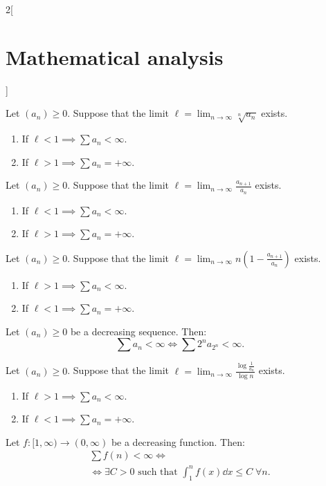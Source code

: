 \documentclass[../../../main.tex]{subfiles}
\begin{document}
\begin{multicols}{2}[\section{Mathematical analysis}]
\begin{theorem}
\end{theorem}
\begin{theorem}
Let $(a_n)\geq 0$. Suppose that the limit $\displaystyle \ell=\lim_{n\to\infty}\sqrt[n]{a_n}$ exists.
\begin{enumerate}
    \item If $\ell<1\implies\sum a_n<\infty$.
    \item If $\ell>1\implies\sum a_n=+\infty$.
\end{enumerate}
\end{theorem}
\begin{theorem}
Let $(a_n)\geq 0$. Suppose that the limit $\displaystyle \ell=\lim_{n\to\infty}\frac{a_{n+1}}{a_n}$ exists.
\begin{enumerate}
    \item If $\ell<1\implies\sum a_n<\infty$.
    \item If $\ell>1\implies\sum a_n=+\infty$.
\end{enumerate}
\end{theorem}
\begin{theorem}
Let $(a_n)\geq 0$. Suppose that the limit $\displaystyle \ell=\lim_{n\to\infty}n\left(1-\frac{a_{n+1}}{a_n}\right)$ exists.
\begin{enumerate}
    \item If $\ell>1\implies\sum a_n<\infty$.
    \item If $\ell<1\implies\sum a_n=+\infty$.
\end{enumerate}
\end{theorem}
\begin{theorem}
Let $(a_n)\geq 0$ be a decreasing sequence. Then: $$\textstyle\sum a_n<\infty\iff\sum 2^na_{2^n}<\infty.$$
\end{theorem}
\begin{theorem}
Let $(a_n)\geq 0$. Suppose that the limit $\displaystyle \ell=\lim_{n\to\infty}\frac{\log\frac{1}{a_n}}{\log n}$ exists.
\begin{enumerate}
    \item If $\ell>1\implies\sum a_n<\infty$.
    \item If $\ell<1\implies\sum a_n=+\infty$.
\end{enumerate}
\end{theorem}
\begin{theorem}\label{MA-inttest}
Let $f:[1,\infty)\rightarrow(0,\infty)$ be a decreasing function. Then:
\begin{multline*}
    \textstyle\sum f(n)<\infty\iff\\\displaystyle\iff\exists C>0\text{ such that }\int_1^nf(x)\dd x\leq C\;\forall n.
\end{multline*}
\end{theorem}

\end{multicols}
\end{document}
